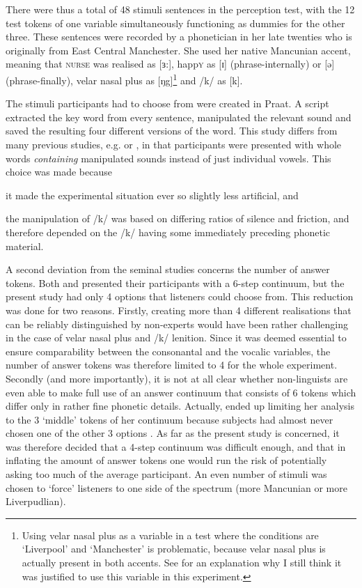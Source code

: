 There were thus a total of 48 stimuli sentences in the perception test, with the 12 test tokens of one variable simultaneously functioning as dummies for the other three.
These sentences were recorded by a phonetician in her late twenties who is originally from East Central Manchester.
She used her native Mancunian accent, meaning that \textsc{nurse} was realised as [ɜ:], happ\textsc{y} as [ɪ] (phrase-internally) or [ə] (phrase-finally), velar nasal plus as [ŋg]\footnote{Using velar nasal plus as a variable in a  test where the conditions are `Liverpool' and `Manchester' is problematic, because velar nasal plus is actually present in both accents. See  for an explanation why I still think it was justified to use this variable in this  experiment.} and /k/ as [k].

The stimuli participants had to choose from were created in Praat.
A script extracted the key word from every sentence, manipulated the relevant sound and saved the resulting four different versions of the word.
This study differs from many previous studies, e.g. \citealt{hayetal2006a} or \citealt{niedzielski1999}, in that participants were presented with whole words \emph{containing} manipulated sounds instead of just individual vowels.
This choice was made because
\begin{inparaenum}[(a)]
	\item it made the experimental situation ever so slightly less artificial, and
	\item the manipulation of /k/ was based on differing ratios of silence and friction, and therefore depended on the /k/ having some immediately preceding phonetic material.
\end{inparaenum}
A second deviation from the seminal studies concerns the number of answer tokens.
Both \citeauthor{niedzielski1999} and \citeauthor{hayetal2006a} presented their participants with a 6-step continuum, but the present study had only 4 options that listeners could choose from.
This reduction was done for two reasons.
Firstly, creating more than 4 different realisations that can be reliably distinguished by non-experts would have been rather challenging in the case of velar nasal plus and /k/ lenition.
Since it was deemed essential to ensure comparability between the consonantal and the vocalic variables, the number of answer tokens was therefore limited to 4 for the whole experiment.
Secondly (and more importantly), it is not at all clear whether non-linguists are even able to make full use of an answer continuum that consists of 6 tokens which differ only in rather fine phonetic details.
Actually, \citealt{niedzielski1999} ended up limiting her analysis to the 3 `middle' tokens of her continuum because subjects had almost never chosen one of the other 3 options \parencite[cf.][64--65]{niedzielski1999}.
As far as the present study is concerned, it was therefore decided that a 4-step continuum was difficult enough, and that in inflating the amount of answer tokens one would run the risk of potentially asking too much of the average participant.
An even number of stimuli was chosen to `force' listeners to one side of the spectrum (more Mancunian or more Liverpudlian).

